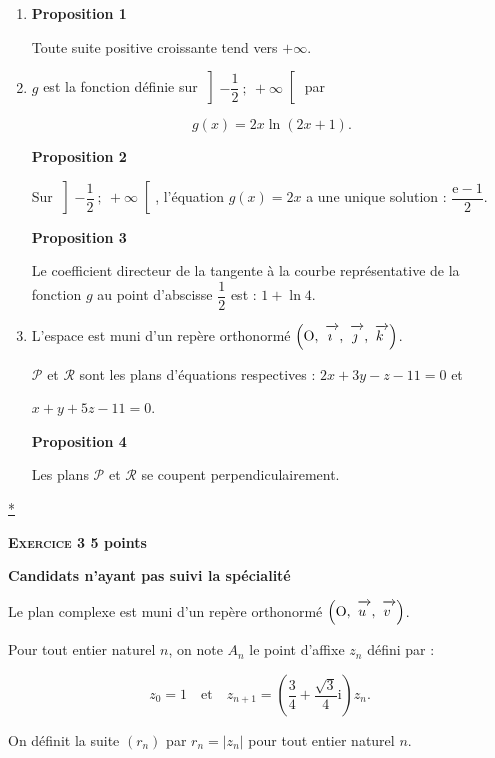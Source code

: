 \documentclass[10pt]{article}
\newcommand{\vect}[1]{\mathchoice%
{\overrightarrow{\displaystyle\mathstrut#1\,\,}}%
{\overrightarrow{\textstyle\mathstrut#1\,\,}}%
{\overrightarrow{\scriptstyle\mathstrut#1\,\,}}%
{\overrightarrow{\scriptscriptstyle\mathstrut#1\,\,}}}
\def\Oijk{$\left(\text{O},~\vect{\imath},~\vect{\jmath},~\vect{k}\right)$}
\def\Ouv{$\left(\text{O},~\vect{u},~\vect{v}\right)$}
\begin{document}
\begin{enumerate}
\item \textbf{Proposition 1}
 
Toute suite positive croissante tend vers $+ \infty$. 
\item  $g$ est la fonction définie sur $\left]- \dfrac{1}{2}~;~+ \infty\right[$ par 

\[g(x) = 2x \ln (2x + 1).\]
 
\textbf{Proposition 2}
 
Sur $\left]- \dfrac{1}{2}~;~+ \infty\right[$, l'équation $g(x) = 2x$ a une unique solution : $\dfrac{\text{e} -  1}{2}$.
 
\textbf{Proposition 3}
 
Le coefficient directeur de la tangente à la courbe représentative de la fonction $g$ au point d'abscisse $\dfrac{1}{2}$ est :  $1 + \ln 4$. 
\item  L'espace est muni d'un repère orthonormé \Oijk.
 
$\mathcal{P}$ et $\mathcal{R}$ sont les plans d'équations respectives : $2x + 3y - z - 11 = 0$ et 

$x + y + 5z - 11 = 0$.
 
\textbf{Proposition 4}
 
Les plans $\mathcal{P}$ et $\mathcal{R}$ se coupent perpendiculairement. 
\end{enumerate} 
\hyperlink{Index}{*}
\vspace{0,5cm}

\textbf{\textsc{Exercice 3} \hfill 5 points}
 
\textbf{Candidats n'ayant pas suivi la spécialité }

\medskip

Le plan complexe est muni d'un repère orthonormé \Ouv.
 
Pour tout entier naturel $n$, on note $A_{n}$ le point d'affixe $z_{n}$ défini par : 

\[z_{0} = 1\quad  \text{et}\quad  z_{n+1} = \left(\dfrac{3}{4} + \dfrac{\sqrt{3}}{4}\text{i}\right)z_{n}.\]

On définit la suite $\left(r_{n}\right)$ par $r_{n} = \left|z_{n}\right|$ pour tout entier naturel $n$.

\medskip
 
\end{document}
